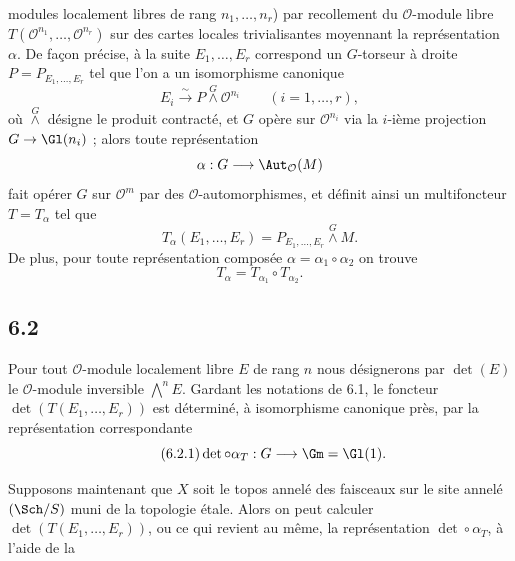 modules localement libres de rang \(n_1,\ldots,n_r\)) par recollement du \(\mathcal O\)-module libre \(T(\mathcal O^{n_1},\ldots,\mathcal O^{n_r})\) sur des cartes locales trivialisantes moyennant la représentation \(\alpha\). De façon précise, à la suite \(E_1,\ldots,E_r\) correspond un \(G\)-torseur à droite \(P=P_{E_1,\ldots,E_r}\) tel que l'on a un isomorphisme canonique
\begin{equation}\tag{6.1.3}
 E_i\xrightarrow{\sim}P\overset{G}{\wedge}\mathcal O^{n_i}\qquad(i=1,\ldots,r),
\end{equation}
où \(\overset{G}{\wedge}\) désigne le produit contracté, et \(G\) opère sur \(\mathcal O^{n_i}\) via la \(i\)-ième projection \(G\to\Gl(n_i)\) ; alors toute représentation
\[
 \alpha:G\longrightarrow\Aut_{\mathcal O}(M)
\]
fait opérer \(G\) sur \(\mathcal O^m\) par des \(\mathcal O\)-automorphismes, et définit ainsi un multifoncteur \(T=T_\alpha\) tel que
\begin{equation}\tag{6.1.4}
 T_\alpha(E_1,\ldots,E_r)=P_{E_1,\ldots,E_r}\overset{G}{\wedge} M.
\end{equation}
De plus, pour toute représentation composée \(\alpha=\alpha_1\circ\alpha_2\) on trouve
\begin{equation}\tag{6.1.5}
 T_\alpha=T_{\alpha_1}\circ T_{\alpha_2}.
\end{equation}

\subsection*{6.2}
Pour tout \(\mathcal O\)-module localement libre \(E\) de rang \(n\) nous désignerons par \(\det(E)\) le \(\mathcal O\)-module inversible \(\bigwedge\limits^n E\). Gardant les notations de 6.1, le foncteur \(\det(T(E_1,\ldots,E_r))\) est déterminé, à isomorphisme canonique près, par la représentation correspondante
\begin{equation}\tag{6.2.1}
 \det\circ\alpha_T:G\longrightarrow\Gm=\Gl(1).
\end{equation}

Supposons maintenant que \(X\) soit le topos annelé des faisceaux sur le site annelé \((\Sch/S)\) muni de la topologie étale. Alors on peut calculer \(\det(T(E_1,\ldots,E_r))\), ou ce qui revient au même, la représentation \(\det\circ\alpha_T\), à l'aide de la

